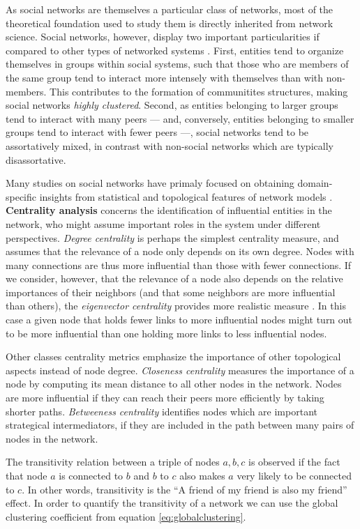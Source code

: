As social networks are themselves a particular class of networks, most of the theoretical foundation used to study them is directly inherited from network science.
%
Social networks, however, display two important particularities if compared to other types of networked systems \cite{Newman2003d}.
First, entities tend to organize themselves in groups within social systems, such that those who are members of the same group tend to interact more intensely with themselves than with non-members.
This contributes to the formation of communitites structures, making social networks \textit{highly clustered}.
Second, as entities belonging to larger groups tend to interact with many peers --- and, conversely, entities belonging to smaller groups tend to interact with fewer peers ---, social networks tend to be assortatively mixed, in contrast with non-social networks which are typically disassortative.  

Many studies on social networks have primaly focused on obtaining domain-specific insights from statistical and topological features of network models \cite{Newman2003b}.
\textbf{Centrality analysis} concerns the identification of influential entities in the network, who might assume important roles in the system under different perspectives.
\textit{Degree centrality} is perhaps the simplest centrality measure, and assumes that the relevance of a node only depends on its own degree. Nodes with many connections are thus more influential than those with fewer connections.
If we consider, however, that the relevance of a node also depends on the relative importances of their neighbors (and that some neighbors are more influential than others), the \textit{eigenvector centrality} provides more realistic measure \cite{Bonacich1987}.
In this case a given node that holds fewer links to more influential nodes might turn out to be more influential than one holding more links to less influential nodes.

Other classes centrality metrics emphasize the importance of other topological aspects instead of node degree.
\textit{Closeness centrality} measures the importance of a node by computing its mean distance to all other nodes in the network. Nodes are more influential if they can reach their peers more efficiently by taking shorter paths.
\textit{Betweeness centrality} identifies nodes which are important strategical intermediators, if they are included in the path between many pairs of nodes in the network.  

The transitivity relation between a triple of nodes ${a,b,c}$ is observed if the fact that node $a$ is connected to $b$ and $b$ to $c$ also makes $a$ very likely to be connected to $c$. 
In other words, transitivity is the ``A friend of my friend is also my friend'' effect.
In order to quantify the transitivity of a network we can use the global clustering coefficient from equation \ref{eq:globalclustering}.

